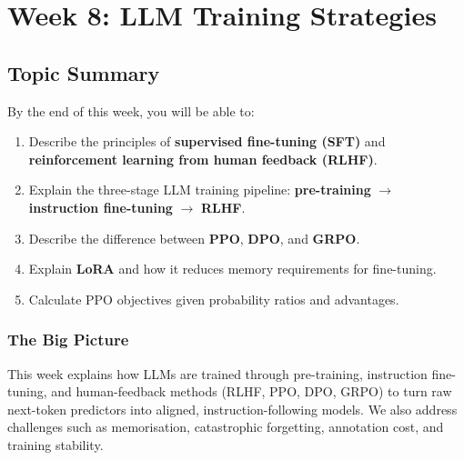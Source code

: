 \section{Week 8: LLM Training Strategies}

\subsection{Topic Summary}

\begin{keybox}
By the end of this week, you will be able to:
\begin{enumerate}
  \item Describe the principles of \textbf{supervised fine-tuning (SFT)} and \textbf{reinforcement learning from human feedback (RLHF)}.
  \item Explain the three-stage LLM training pipeline: \textbf{pre-training} $\to$ \textbf{instruction fine-tuning} $\to$ \textbf{RLHF}.
  \item Describe the difference between \textbf{PPO}, \textbf{DPO}, and \textbf{GRPO}.
  \item Explain \textbf{LoRA} and how it reduces memory requirements for fine-tuning.
  \item Calculate PPO objectives given probability ratios and advantages.
\end{enumerate}
\end{keybox}

\separator

\subsubsection*{The Big Picture}

This week explains how LLMs are trained through pre-training, instruction fine-tuning, and human-feedback methods (RLHF, PPO, DPO, GRPO) to turn raw next-token predictors into aligned, instruction-following models. We also address challenges such as memorisation, catastrophic forgetting, annotation cost, and training stability.

